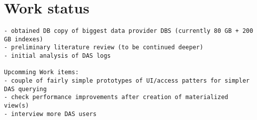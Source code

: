 \documentclass[a4paper,11pt,draft]{article}
\begin{document}
\section{Work status}

\begin{verbatim}
- obtained DB copy of biggest data provider DBS (currently 80 GB + 200 GB indexes)
- preliminary literature review (to be continued deeper)
- initial analysis of DAS logs

Upcomming Work items:
- couple of fairly simple prototypes of UI/access patters for simpler DAS querying
- check performance improvements after creation of materialized view(s)
- interview more DAS users
\end{verbatim}



\thispagestyle{empty}
\begin{small}

\end{small}

\pagebreak

\end{document}

